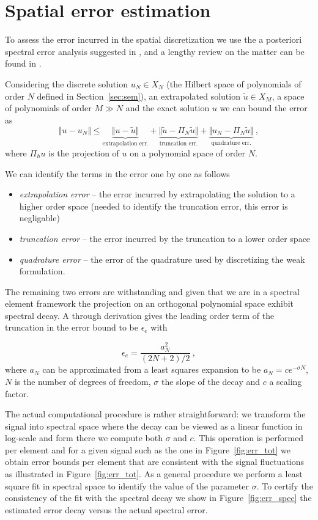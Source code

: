 \documentclass[10pt]{article}
\begin{document}
\section{Spatial error estimation}
\label{sec:err}
To assess the error incurred in the spatial discretization we use the a posteriori spectral error analysis suggested in \cite{Mavriplis1990}, and a lengthy review on the matter can be found in \cite{kopriva2009}. 

Considering the discrete solution $u_N\in X_N$ (the Hilbert space of polynomials of order $N$ defined in Section~\ref{sec:sem}), an extrapolated solution $\tilde u\in X_M$, a space of polynomials of order $M\gg N$ and the exact solution $u$ we can bound the error as
$$\Vert u - u_N\Vert \leq \underbrace{\Vert u-\tilde u\Vert}_{\text{extrapolation err.}} + \underbrace{\Vert \tilde u- \Pi_N \tilde u\Vert}_{\text{truncation err.}} + \underbrace{\Vert u_N-\Pi_N \tilde u\Vert}_{\text{quadrature err.}} \ ,$$
where $\Pi_h u$ is the projection of $u$ on a polynomial space of order $N$.

We can identify the terms in the error one by one as follows
\begin{itemize}
\item \textit{extrapolation error} -- the error incurred by extrapolating the solution to a higher order space (needed to identify the truncation error, this error is negligable)
\item \textit{truncation error} -- the error incurred by the truncation to a lower order space
\item \textit{quadrature error} -- the error of the quadrature used by discretizing the weak formulation.
\end{itemize}

The remaining two errors are withstanding and given that we are in a spectral element framework the projection on an orthogonal polynomial space exhibit spectral decay. A through derivation gives the leading order term of the truncation in the error bound to be $\epsilon_e$ with

$$\epsilon_e=\frac{a_N^2}{(2N+2)/2}\ , $$
where $a_N$ can be approximated from a least squares expansion to be $a_N=ce^{-\sigma N}$, $N$ is the number of degrees of freedom, $\sigma$ the slope of the decay and $c$ a scaling factor. 

The actual computational procedure is rather straightforward: we transform the signal into spectral space where the decay can be viewed as a linear function in log-scale and form there we compute both $\sigma$ and $c$.
This operation is performed per element and for a given signal such as the one in Figure~\ref{fig:err_tot} we obtain error bounds per element that are consistent with the signal fluctuations as illustrated in Figure~\ref{fig:err_tot}. As a general procedure we perform a least square fit in spectral space to identify the value of the parameter $\sigma$. To certify the consistency of the fit with the spectral decay we show in Figure~\ref{fig:err_spec} the estimated error decay versus the actual spectral error.
\end{document}
